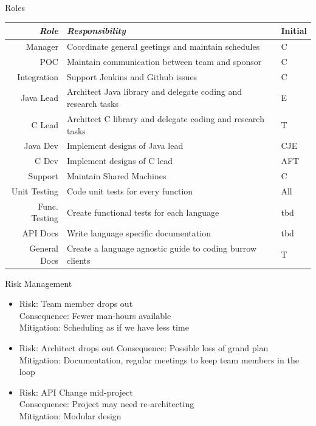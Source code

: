 \documentclass{beamer}
\begin{document}
\begin{frame}{Roles}
  \begin{center}
    {\footnotesize
      \begin{tabular*}{.966\linewidth}{| r | p{7.7cm} | l |}
        \hline
        \emph{Role} & \emph{Responsibility} & Initial\\ \hline \hline
        Manager & Coordinate general geetings and maintain schedules & C\\ \hline
        POC & Maintain communication between team and sponsor & C\\ \hline
        Integration & Support Jenkins and Github issues & C\\ \hline 
        Java Lead & Architect Java library and delegate coding and research tasks & E\\ \hline
        C Lead & Architect C library and delegate coding and research tasks & T\\ \hline
        Java Dev & Implement designs of Java lead & CJE\\ \hline
        C Dev & Implement designs of C lead & AFT\\ \hline
        Support & Maintain Shared Machines & C\\ \hline
        Unit Testing & Code unit tests for every function & All\\ \hline
        Func. Testing & Create functional tests for each language & tbd \\ \hline
        API Docs & Write language specific documentation & tbd \\ \hline
        General Docs & Create a language agnostic guide to coding burrow clients & T\\ \hline
    \end{tabular*}
    }
  \end{center}
\end{frame}

\begin{frame}{Risk Management}
  \begin{itemize}
  \item Risk: Team member drops out\\
    Consequence: Fewer man-hours available\\
    Mitigation: Scheduling as if we have less time\\
  \item Risk: Architect drops out
    Consequence: Possible loss of grand plan\\
    Mitigation: Documentation, regular meetings to keep team members in the loop
  \item Risk: API Change mid-project\\
    Consequence: Project may need re-architecting\\
    Mitigation: Modular design
  \end{itemize}
\end{frame}
\end{document}
